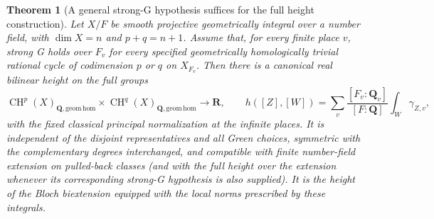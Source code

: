 \documentclass[11pt,a4paper]{article}
\newtheorem{theorem}{Theorem}[section]
\theoremstyle{definition}
\theoremstyle{remark}
\numberwithin{equation}{section}
\begin{document}
\begin{theorem}[A general strong-G hypothesis suffices for the full height construction]
\label{r16ph:general-height}
Let $X/F$ be smooth projective geometrically integral over a
number field, with $\dim X=n$ and $p+q=n+1$.
Assume that, for every finite place $v$, strong G holds over
$F_v$ for every specified geometrically homologically trivial
rational cycle of codimension $p$ or $q$ on $X_{F_v}$.
Then there is a canonical real bilinear height on the full groups
\[
 \operatorname{CH}^p(X)_{\mathbf Q,\mathrm{geom\,hom}}
 \times\operatorname{CH}^q(X)_{\mathbf Q,\mathrm{geom\,hom}}
                         \longrightarrow\mathbf R,
 \qquad
 h([Z],[W])=\sum_v\frac{[F_v:\mathbf Q_v]}{[F:\mathbf Q]}
                         \int_W\gamma_{Z,v},
 \tag{PH16.10}\label{r16ph:general-height-formula}
\]
with the fixed classical principal normalization at the infinite
places.  It is independent of the disjoint representatives and
all Green choices, symmetric with the complementary degrees
interchanged, and compatible with finite number-field extension
on pulled-back classes (and with the full height over the extension
whenever its corresponding strong-G hypothesis is also supplied).
It is the height of the Bloch biextension equipped with the
local norms prescribed by these integrals.

\end{theorem}
\end{document}
